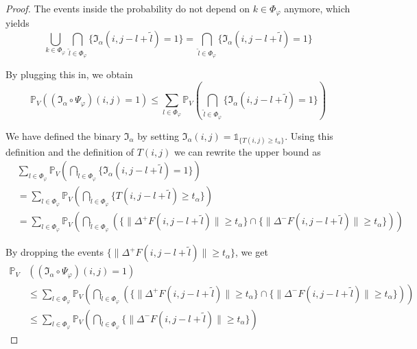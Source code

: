 \documentclass[a4paper,12pt]{article}
\newcommand{\norm}[1]{\lVert#1\rVert}
\theoremstyle{plain}
\theoremstyle{definition}
\begin{document}
\begin{proof}
	The events inside the probability do not depend on $k \in \Phi_\varphi$ anymore, which yields
	\begin{equation*}
		\bigcup_{k \in \Phi_\varphi} \bigcap_{\tilde{l} \in \Phi_\varphi} \{ \mathfrak{I}_\alpha(i, j - l + \tilde{l}) = 1 \} = \bigcap_{\tilde{l} \in \Phi_\varphi} \{ \mathfrak{I}_\alpha(i, j - l + \tilde{l}) = 1 \}
	\end{equation*}
	
	By plugging this in, we obtain
	\begin{equation*}
		\mathbb{P}_V( (\mathfrak{I}_\alpha \circ \Psi_\varphi)(i, j) = 1 ) \leq \sum_{l \in \Phi_\varphi} \mathbb{P}_V\left( \bigcap_{\tilde{l} \in \Phi_\varphi} \{ \mathfrak{I}_\alpha(i, j - l + \tilde{l}) = 1 \} \right)
	\end{equation*}
	
	We have defined the binary $\mathfrak{I}_\alpha$ by setting $\mathfrak{I}_\alpha(i, j) = \mathds{1}_{ \{ T(i, j) \geq t_\alpha \} }$. Using this definition and the definition of $T(i, j)$ we can rewrite the upper bound as
	\begin{align*}
		&\sum_{l \in \Phi_\varphi} \mathbb{P}_V\left( \bigcap_{\tilde{l} \in \Phi_\varphi} \{ \mathfrak{I}_\alpha(i, j - l + \tilde{l}) = 1 \} \right) \\
		&= \sum_{l \in \Phi_\varphi} \mathbb{P}_V\left( \bigcap_{\tilde{l} \in \Phi_\varphi} \{ T(i, j - l + \tilde{l}) \geq t_\alpha \} \right) \\
		&= \sum_{l \in \Phi_\varphi} \mathbb{P}_V\left( \bigcap_{\tilde{l} \in \Phi_\varphi} \left( \{ \norm{\Delta^+ F(i, j - l + \tilde{l})} \geq t_\alpha \} \cap \{ \norm{\Delta^- F(i, j - l + \tilde{l})} \geq t_\alpha \} \right) \right)
	\end{align*}
	
	By dropping the events $\{ \norm{\Delta^+ F(i, j - l + \tilde{l})} \geq t_\alpha \}$, we get
	\begin{align*}
		\mathbb{P}_V&( (\mathfrak{I}_\alpha \circ \Psi_\varphi)(i, j) = 1 ) \\
		&\leq \sum_{l \in \Phi_\varphi} \mathbb{P}_V\left( \bigcap_{\tilde{l} \in \Phi_\varphi} \left( \{ \norm{\Delta^+ F(i, j - l + \tilde{l})} \geq t_\alpha \} \cap \{ \norm{\Delta^- F(i, j - l + \tilde{l})} \geq t_\alpha \} \right) \right) \\
		&\leq \sum_{l \in \Phi_\varphi} \mathbb{P}_V\left( \bigcap_{\tilde{l} \in \Phi_\varphi} \{ \norm{\Delta^- F(i, j - l + \tilde{l})} \geq t_\alpha \} \right)
	\end{align*}
	

\end{proof}
\end{document}
